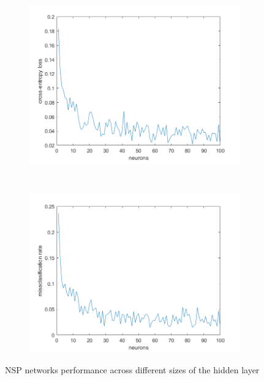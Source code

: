 \documentclass[11pt,a4paper]{article}
\begin{document}
\begin{figure}[htb]
  \centering
  \begin{subfigure}[b]{0.48\textwidth}
    \centering
    \includegraphics[width=\textwidth]{figures/delta_ce_nsp.png}
  \end{subfigure}
  ~
  \begin{subfigure}[b]{0.48\textwidth}
    \centering
    \includegraphics[width=\textwidth]{figures/delta_misclass_rate_nsp.png}
  \end{subfigure}
  \caption{NSP networks performance across different sizes of the hidden layer}
  \label{fig:NSP_performance}
\end{figure}

\end{document}
